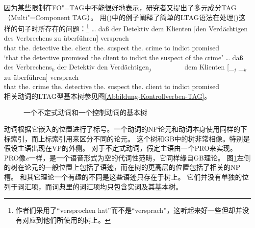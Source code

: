 因为某些限制在FO"=TAG中不能很好地表示\citep[--50]{Rambow94a}，研究者又提出了多元成分TAG（Multi"=Component TAG）。 
\citet*{JBR2000a}用()中的例子阐释了简单的LTAG语法在处理()这样的句子时所存在的问题：\footnote{
  作者们采用了``{versprochen hat}''而不是``{versprach}''，这听起来好一些但却并没有对应到他们所使用的树上。
}
\eal
\ex 
\gll \ldots{} daß  der        Detektiv  dem        Klienten [den Verdächtigen des Verbrechens zu überführen] versprach\\
         {}   that the.\nom{} detective the.\dat{} client   \spacebr{}the.\acc{} suspect the.\gen{} crime to indict promised\\
  \glt `that the detective promised the client to indict the suspect of the crime'
\ex\label{Beispiel-Joshi-NP4} 
\gll \ldots{} daß  des        Verbrechens$_k$ der        Detektiv  den Verdächtigen$_j$~~~~~~~~~ dem         Klienten [\_$_j$ \_$_k$ zu überführen] versprach\\
      {}      that the.\gen{} crime           the.\nom{} detective the.\acc{} suspect   the.\dat{}  client   {}      {}     to indict      promised\\
\zl
相关动词的LTAG型基本树参见图\vref{Abbildung-Kontrollverben-TAG}。
\begin{figure}
\caption{\label{Abbildung-Kontrollverben-TAG}一个不定式动词和一个控制动词的基本树} 
\end{figure}%
动词根据它嵌入的位置进行了标号。一个动词的NP论元和动词本身使用同样的下标索引，而上标索引用来区分不同的论元。
这个树和GB\indexgb 中的树非常相像。特别是假设主语出现在VP的外侧。
对于不定式动词，假定主语由一个PRO来实现。PRO像\emph{e}一样，是一个语音形式为空的代词性范畴，它同样缘自GB理论。
图\ref{Abbildung-Kontrollverben-TAG}左侧的树在论元的一般位置上包括了语迹，而在树的更高层的位置包括了相关的NP槽。
和其它理论一个有趣的不同是这些语迹只存在于树上。
它们并没有单独的位列于词汇项，而词典里的词汇项均只包含实词及其基本树。

